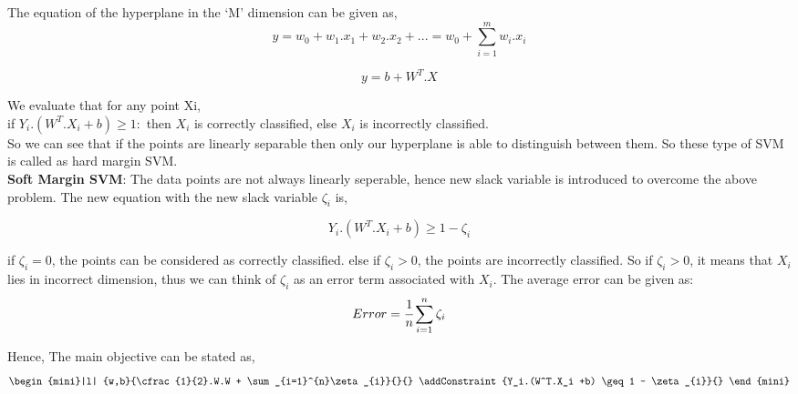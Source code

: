 \documentclass{article}
\begin{document}
The equation of the hyperplane in the ‘M’ dimension can be given as, \\
\begin{equation*}
               y = w_0 + w_1.x_1 + w_2.x_2 + ... 
                 = w_0 + \sum_{i=1}^{m} w_i.x_i  
\end{equation*}

\begin{equation*}
               y  = b + W^T.X
\end{equation*} 

We evaluate that for any point Xi, \\

if $Y_i.(W^T.X_i +b) \geq 1:$ then $X_i$ is correctly classified, else $X_i$ is incorrectly classified. \\ 

So we can see that if the points are linearly separable then only our hyperplane is able to distinguish between them. So these type of SVM is called as hard margin SVM. \\ 

\textbf{Soft Margin SVM}: The data points are not always linearly seperable, hence new slack variable is introduced to overcome the above problem. 
The new equation with the new slack variable $\zeta_{i}$ is, 

\begin{equation*}
               Y_i.(W^T.X_i +b) \geq 1 - \zeta_{i}
\end{equation*} 

if $\zeta_i= 0$, the points can be considered as correctly classified.
else if $\zeta_i> 0$, the points are incorrectly classified.  So if $\zeta_i> 0$, it means that $X_i$ lies in incorrect dimension, thus we can think of $\zeta_i$ as an error term associated with $X_i$. The average error can be given as:
\begin{equation*}
             Error =  \cfrac{1}{n} \sum_{i=1}^{n} \zeta_{i}
\end{equation*}

Hence, The main objective can be stated as, 
\begin{equation*}
              \begin{mini}|l|
        	  {w,b}{\cfrac{1}{2}.W.W  + \sum_{i=1}^{n}\zeta_{i}}{}{}
        	  \addConstraint{Y_i.(W^T.X_i +b) \geq 1 - \zeta_{i}}{}
             \end{mini}
\end{equation*} 
\end{document}
